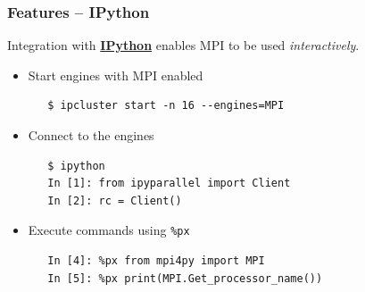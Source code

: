 \begin{frame}[fragile]
  \frametitle{Features -- IPython}
  Integration with \href{http://ipython.scipy.org}{\textbf{IPython}}
  enables MPI to be used \emph{interactively}.
  \begin{itemize}
  \item Start engines with MPI enabled
\begin{verbatim}
   $ ipcluster start -n 16 --engines=MPI
\end{verbatim}
  \item Connect to the engines
\begin{verbatim}
   $ ipython
   In [1]: from ipyparallel import Client
   In [2]: rc = Client()
\end{verbatim}
  \item Execute commands using \texttt{\%px}
\begin{verbatim}
   In [4]: %px from mpi4py import MPI
   In [5]: %px print(MPI.Get_processor_name())
\end{verbatim}
  \end{itemize}
\end{frame}

